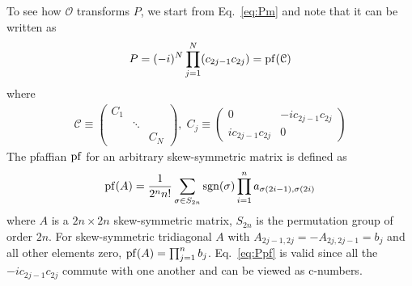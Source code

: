 To see how $\mathcal{O}$ transforms $P$, we start from Eq.~\ref{eq:Pm} and note that it can be written as
\begin{eqnarray}\label{eq:Ppf}
	P = (-i)^N \prod_{j=1}^N (c_{2j-1}c_{2j}) = {\rm pf}(\mathcal{C})
\end{eqnarray}
where
\begin{eqnarray}
	\mathcal{C} \equiv\begin{pmatrix}
		C_1 & & \\
		& \ddots & \\
		& & C_N
	\end{pmatrix},\; C_j\equiv \begin{pmatrix}
0 & -i c_{2j-1} c_{2j} \\
i c_{2j-1} c_{2j} & 0
\end{pmatrix}
\end{eqnarray}
The pfaffian $\rm pf$ for an arbitrary skew-symmetric matrix is defined as
\begin{eqnarray}
	{\rm pf}(A) = \frac{1}{2^n n!} \sum_{\sigma \in S_{2n}} {\rm sgn}(\sigma) \prod_{i=1}^n a_{\sigma(2i-1), \sigma(2i)}
\end{eqnarray}
where $A$ is a $2n\times 2n$ skew-symmetric matrix, $S_{2n}$ is the permutation group of order $2n$. For skew-symmetric tridiagonal $A$ with $A_{2j-1, 2j} = - A_{2j, 2j-1} = b_j$ and all other elements zero, ${\rm pf}(A) = \prod_{j=1}^n b_j $. Eq.~\ref{eq:Ppf} is valid since all the $-i c_{2j -1} c_{2j}$ commute with one another and can be viewed as c-numbers.

